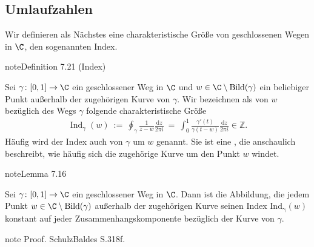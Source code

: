 \documentclass[letterpaper,10pt,german]{jupyterBook}
\begin{document}
\subsection{Umlaufzahlen}
\label{\detokenize{complexanalysis/residuensatz:umlaufzahlen}}
\sphinxAtStartPar
Wir definieren als Nächstes eine charakteristische Größe von geschlossenen Wegen in \(\C\), den sogenannten Index.
\label{complexanalysis/residuensatz:definition-10}
\begin{sphinxadmonition}{note}{Definition 7.21 (Index)}



\sphinxAtStartPar
Sei \(\gamma \colon [0,1] \rightarrow \C\) ein geschlossener Weg in \(\C\) und \(w \in \C \setminus \operatorname{Bild}(\gamma)\) ein beliebiger Punkt außerhalb der zugehörigen Kurve von \(\gamma\).
Wir bezeichnen als  von \(w\) bezüglich des Wegs \(\gamma\) folgende charakteristische Größe
\begin{equation*}
\begin{split}\operatorname{Ind}_\gamma(w) \ := \ \oint_\gamma \frac{1}{z - w} \frac{\mathrm{d}z}{2\pi i} \ = \ \int_0^1 \frac{\gamma'(t)}{\gamma(t - w)} \frac{\mathrm{d}z}{2\pi i} \in \mathbb{Z}.\end{split}
\end{equation*}
\sphinxAtStartPar
Häufig wird der Index auch  von \(\gamma\) um \(w\) genannt.
Sie ist eine , die anschaulich beschreibt, wie häufig sich die zugehörige Kurve um den Punkt \(w\) windet.
\end{sphinxadmonition}

\sphinxAtStartPar
{}
\label{complexanalysis/residuensatz:lemma-11}
\begin{sphinxadmonition}{note}{Lemma 7.16}



\sphinxAtStartPar
Sei \(\gamma \colon [0,1] \rightarrow \C\) ein geschlossener Weg in \(\C\).
Dann ist die Abbildung, die jedem Punkt \(w \in \C \setminus \operatorname{Bild}(\gamma)\) außerhalb der zugehörigen Kurve seinen Index \(\operatorname{Ind_\gamma}(w)\) konstant auf jeder Zusammenhangskomponente bezüglich der Kurve von \(\gamma\).
\end{sphinxadmonition}

\begin{sphinxadmonition}{note}
\sphinxAtStartPar
Proof. Schulz\sphinxhyphen{}Baldes S.318f.
\end{sphinxadmonition}
\end{document}
